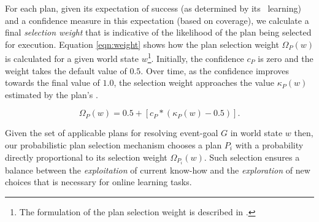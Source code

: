 For each plan, given its expectation of success (as determined by its \dt\ learning) and a confidence measure in this expectation (based on coverage), we calculate a final \textit{selection weight} that is indicative of the likelihood of the plan being selected for execution. Equation \ref{eqn:weight} shows how the plan selection weight $\Omega_P(w)$ is calculated for a given world state $w$\footnote{The formulation of the plan selection weight is described in \cite{Singh:AAMAS10}.}. Initially, the confidence $c_P$ is zero and the weight takes the default value of $0.5$. Over time, as the confidence improves towards the final value of $1.0$, the selection weight approaches the value $\kappa_P(w)$ estimated by the plan's \dt.


\begin{equation}\label{eqn:weight}   
\Omega_P(w) = 0.5 + \left[  c_P *  \left( \kappa_P(w) - 0.5 \right)  \right].
\end{equation}


Given the set of applicable plans for resolving event-goal $G$ in world state $w$ then, our probabilistic plan selection mechanism chooses a plan $P_i$ with a probability directly proportional to its selection weight $\Omega_{P_i}(w)$. Such selection ensures a balance between the \emph{exploitation} of current know-how and the \textit{exploration} of new choices that is necessary for online learning tasks. 



